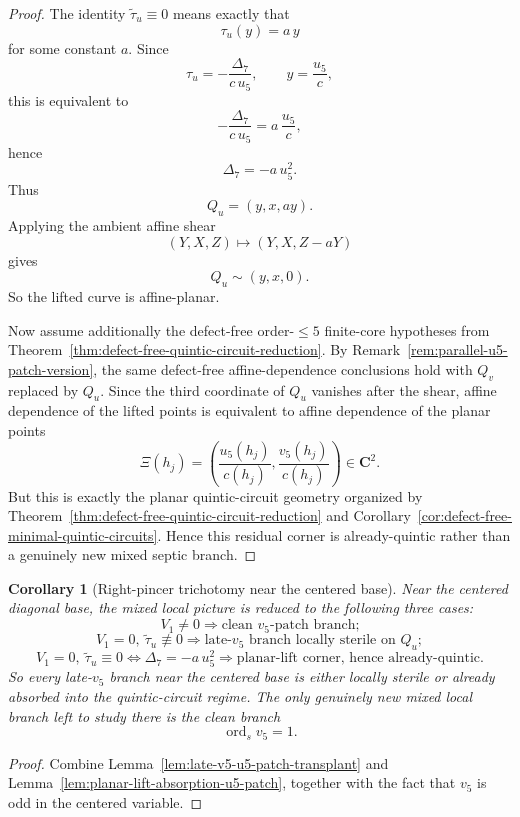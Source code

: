 \documentclass[11pt,a4paper]{amsart}
\theoremstyle{plain}
\newtheorem{corollary}[theorem]{Corollary}
\theoremstyle{definition}
\begin{document}
\begin{proof}
The identity $\widetilde\tau_u\equiv 0$ means exactly that
\[
\tau_u(y)=a\,y
\]
for some constant $a$. Since
\[
\tau_u=-\frac{\Delta_7}{c\,u_5},
\qquad
y=\frac{u_5}{c},
\]
this is equivalent to
\[
-\frac{\Delta_7}{c\,u_5}=a\,\frac{u_5}{c},
\]
hence
\[
\Delta_7=-a\,u_5^2.
\]
Thus
\[
Q_u=(y,x,ay).
\]
Applying the ambient affine shear
\[
(Y,X,Z)\longmapsto (Y,X,Z-aY)
\]
gives
\[
Q_u\sim (y,x,0).
\]
So the lifted curve is affine-planar.

Now assume additionally the defect-free order-$\le 5$ finite-core hypotheses
from Theorem~\ref{thm:defect-free-quintic-circuit-reduction}. By
Remark~\ref{rem:parallel-u5-patch-version}, the same defect-free
affine-dependence conclusions hold with $Q_v$ replaced by $Q_u$. Since the
third coordinate of $Q_u$ vanishes after the shear, affine dependence of the
lifted points is equivalent to affine dependence of the planar points
\[
\Xi(h_j)=\left(\frac{u_5(h_j)}{c(h_j)},\frac{v_5(h_j)}{c(h_j)}\right)\in\mathbf C^2.
\]
But this is exactly the planar quintic-circuit geometry organized by
Theorem~\ref{thm:defect-free-quintic-circuit-reduction} and
Corollary~\ref{cor:defect-free-minimal-quintic-circuits}. Hence this residual
corner is already-quintic rather than a genuinely new mixed septic branch.
\end{proof}

\begin{corollary}[Right-pincer trichotomy near the centered base]
\label{cor:right-pincer-trichotomy-centered-base}
Near the centered diagonal base, the mixed local picture is reduced to the
following three cases:
\[
V_1\neq 0
\Longrightarrow
\text{clean }v_5\text{-patch branch;}
\]
\[
V_1=0,\ \widetilde\tau_u\not\equiv 0
\Longrightarrow
\text{late-}v_5\text{ branch locally sterile on }Q_u;
\]
\[
V_1=0,\ \widetilde\tau_u\equiv 0
\Longleftrightarrow
\Delta_7=-a\,u_5^2
\Longrightarrow
\text{planar-lift corner, hence already-quintic.}
\]
So every late-$v_5$ branch near the centered base is either locally sterile
or already absorbed into the quintic-circuit regime. The only genuinely new
mixed local branch left to study there is the clean branch
\[
\operatorname{ord}_s v_5=1.
\]
\end{corollary}

\begin{proof}
Combine Lemma~\ref{lem:late-v5-u5-patch-transplant} and
Lemma~\ref{lem:planar-lift-absorption-u5-patch}, together with the fact that
$v_5$ is odd in the centered variable.
\end{proof}
\end{document}
